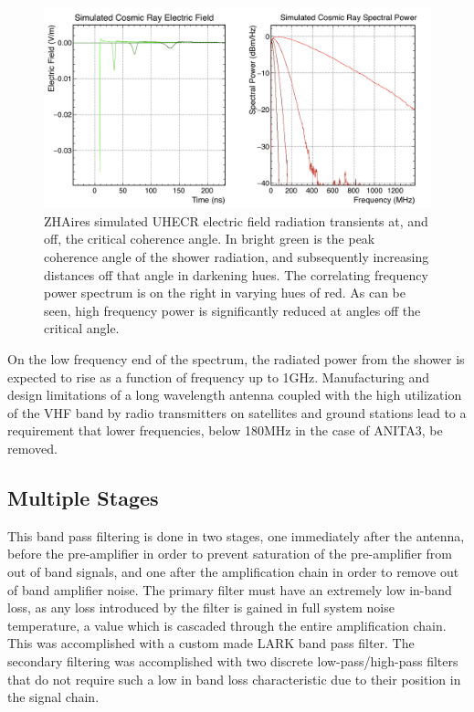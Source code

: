 \begin{figure}
\centering
	\includegraphics[width=\textwidth]{figures/CosmicRayOffAngle}
	\caption{ZHAires simulated UHECR electric field radiation transients at, and off, the critical coherence angle.  In bright green is the peak coherence angle of the shower radiation, and subsequently increasing distances off that angle in darkening hues.  The correlating frequency power spectrum is on the right in varying hues of red.  As can be seen, high frequency power is significantly reduced at angles off the critical angle. }
	\label{fig:CROffAngle}
\end{figure}	

		On the low frequency end of the spectrum, the radiated power from the shower is expected to rise as a function of frequency up to 1GHz.  Manufacturing and design limitations of a long wavelength antenna coupled with the high utilization of the VHF band by radio transmitters on satellites and ground stations lead to a requirement that lower frequencies, below 180MHz in the case of ANITA3, be removed.
		
	\subsection{Multiple Stages}
		This band pass filtering is done in two stages, one immediately after the antenna, before the pre-amplifier in order to prevent saturation of the pre-amplifier from out of band signals, and one after the amplification chain in order to remove out of band amplifier noise.  The primary filter must have an extremely low in-band loss, as any loss introduced by the filter is gained in full system noise temperature, a value which is cascaded through the entire amplification chain.  This was accomplished with a custom made LARK band pass filter.  The secondary filtering was accomplished with two discrete low-pass/high-pass filters that do not require such a low in band loss characteristic due to their position in the signal chain.
		
